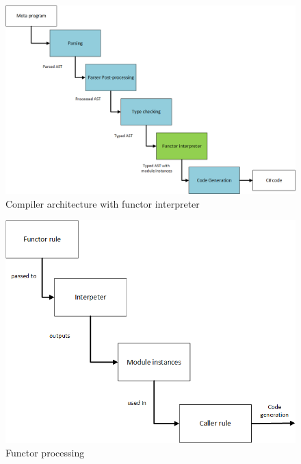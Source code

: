 \begin{figure}
	\centering
	\includegraphics[width=\textwidth]{Figures/chapter_functors/compiler_architecture_functors}
	\caption{Compiler architecture with functor interpreter}
	\label{fig:ch_functors_compiler_architecture}
\end{figure}

\begin{figure}
	\centering
	\includegraphics[width=\textwidth]{Figures/chapter_functors/functor_rule_processing}
	\caption{Functor processing}
	\label{fig:ch_functors_functor_processing}
\end{figure}

